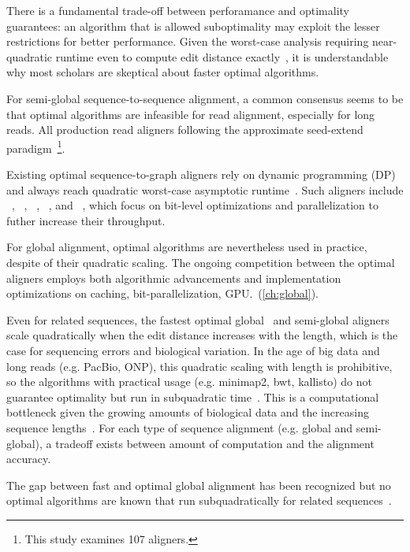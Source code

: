 There is a fundamental trade-off between perforamance and optimality guarantees:
an algorithm that is allowed suboptimality may exploit the lesser restrictions
for better performance. Given the worst-case analysis requiring near-quadratic
runtime even to compute edit distance exactly~\citep{backurs2015edit}, it is
understandable why most scholars are skeptical about faster optimal algorithms.

For semi-global sequence-to-sequence alignment, a common consensus seems to be
that optimal algorithms are infeasible for read alignment, especially for long
reads. All production read aligners following the approximate seed-extend
paradigm~\cite{alser2021technology}\footnote{This study examines 107 aligners.}.

Existing optimal sequence-to-graph aligners rely on dynamic programming (DP) and
always reach quadratic worst-case asymptotic runtime~\citep{equi2019complexity}.
Such aligners include \vargas~\citep{darby2020vargas},
\pasgal~\citep{jain_accelerating_2019},
\graphaligner~\citep{rautiainen_bitparallel_2019},
\hga~\citep{feng2021accelerating}, and \vg~\citep{garrison_variation_2018},
which focus on bit-level optimizations and parallelization to futher increase
their throughput.

For global alignment, optimal algorithms are nevertheless used in practice,
despite of their quadratic scaling. The ongoing competition between the optimal
aligners employs both algorithmic advancements and implementation optimizations
on caching, bit-parallelization, GPU.~(\cref{ch:global}).

Even for related sequences, the fastest optimal
global~\citep{marco2021fast,vsovsic2017edlib} and semi-global
aligners~\citep{rautiainen_bitparallel_2019} scale quadratically when the edit
distance increases with the length, which is the case for sequencing errors and
biological variation. In the age of big data and long reads (e.g. PacBio, ONP),
this quadratic scaling with length is prohibitive, so the algorithms with
practical usage (e.g. minimap2, bwt, kallisto) do not guarantee optimality but
run in subquadratic time~\citep{kucherov2019evolution}. This is a computational
bottleneck given the growing amounts of biological data and the increasing
sequence lengths~\citep{kucherov2019evolution}. For each type of sequence
alignment (e.g. global and semi-global), a tradeoff exists between amount of
computation and the alignment accuracy.

The gap between fast and optimal global alignment has been recognized but no
optimal algorithms are known that run subquadratically for related
sequences~\citep{medvedev2022theoretical}.


